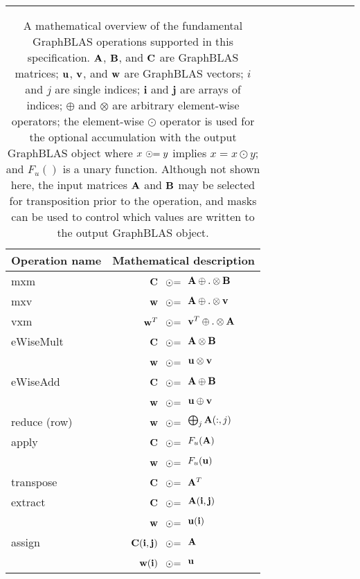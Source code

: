 \begin{table}[h]
\hrule
\begin{center}
\caption{A mathematical overview of the fundamental GraphBLAS operations supported
in this specification. ${\bf A}$, ${\bf B}$, and ${\bf C}$ are GraphBLAS matrices; 
${\bf u}$, ${\bf v}$, and ${\bf w}$ are GraphBLAS vectors; $i$ and $j$ are single indices;
$\mathbf{i}$ and $\mathbf{j}$ are arrays of indices;
$\oplus$ and $\otimes$ are arbitrary element-wise operators; the element-wise $\odot$
operator is used for the optional accumulation with the output GraphBLAS object where 
$x~\odot\hspace{-0.11cm}= y$ implies $x = x \odot y$; and $F_u()$ is a unary function.
Although not shown here, the input 
matrices ${\bf A}$ and ${\bf B}$ may be selected for transposition prior to 
the operation, and masks can be used to control which values are written to the output GraphBLAS object.}
\label{Tab:GraphBLASOps}
\newcommand{\odotequals}{~\odot\hspace{-0.09cm}=\hspace{-0.2cm}}
\begin{tabular}{l|rl}
{\sf Operation name} & \multicolumn{2}{c}{Mathematical description}  \\
\hline
{\sf mxm}          & ${\bf C}$    $\odotequals$ & ${\bf A} \oplus.\otimes {\bf B}$ \\
{\sf mxv}          & ${\bf w}$    $\odotequals$ & ${\bf A} \oplus.\otimes {\bf v}$ \\
{\sf vxm}          & ${\bf w}^T$  $\odotequals$ & ${\bf v}^T \oplus.\otimes {\bf A}$  \\
{\sf eWiseMult}    & ${\bf C}$    $\odotequals$ & ${\bf A} \otimes {\bf B}$ \\
                   & ${\bf w}$    $\odotequals$ & ${\bf u} \otimes {\bf v}$ \\
{\sf eWiseAdd}     & ${\bf C}$    $\odotequals$ & ${\bf A} \oplus {\bf B}$ \\
                   & ${\bf w}$    $\odotequals$ & ${\bf u} \oplus {\bf v}$ \\
{\sf reduce} (row) & ${\bf w}$    $\odotequals$ & $\bigoplus_j{\bf A}(:,j)$  \\
{\sf apply}        & ${\bf C}$    $\odotequals$ & $F_u({\bf A})$ \\
                   & ${\bf w}$    $\odotequals$ & $F_u({\bf u})$ \\
{\sf transpose}    & ${\bf C}$    $\odotequals$ & ${\bf A}^T$ \\
{\sf extract}      & ${\bf C}$    $\odotequals$ & ${\bf A}({\bf i},{\bf j})$ \\
                   & ${\bf w}$    $\odotequals$ & ${\bf u}({\bf i})$ \\
{\sf assign}       & ${\bf C}({\bf i},{\bf j})$  $\odotequals$ &  ${\bf A}$ \\
                   & ${\bf w}({\bf i})$  $\odotequals$ & ${\bf u}$ 
\end{tabular}


\end{center}
\end{table}
